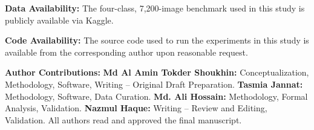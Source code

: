 \documentclass[11pt]{article}
\begin{document}
\noindent\textbf{Data Availability:} The four-class, 7,200-image benchmark used in this study is publicly available via Kaggle.

\noindent\textbf{Code Availability:} The source code used to run the experiments in this study is available from the corresponding author upon reasonable request.

\noindent\textbf{Author Contributions:} \textbf{Md Al Amin Tokder Shoukhin:} Conceptualization, Methodology, Software, Writing -- Original Draft Preparation. \textbf{Tasmia Jannat:} Methodology, Software, Data Curation. \textbf{Md. Ali Hossain:} Methodology, Formal Analysis, Validation. \textbf{Nazmul Haque:} Writing -- Review and Editing, Validation. All authors read and approved the final manuscript.



\end{document}
